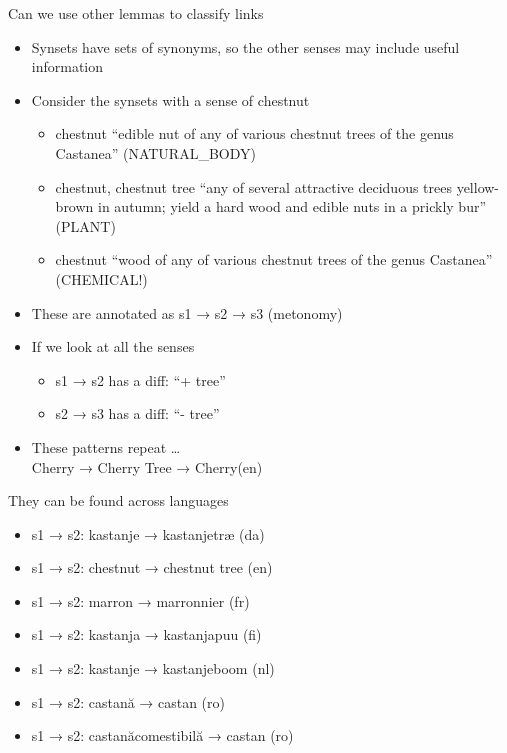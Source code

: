 \documentclass[dvipsnames]{beamer}
\begin{document}
\begin{frame}{Can we use other lemmas to classify links}

  \begin{itemize}
  \item Synsets have sets of synonyms, so the other senses may include useful information
  \item Consider the synsets with a sense of chestnut
    \begin{itemize}
    \item[s1] chestnut ``edible nut of any of various chestnut trees of the genus Castanea'' (NATURAL\_BODY)

    \item[s2] chestnut, chestnut tree ``any of several attractive deciduous trees yellow-brown in autumn; yield a hard wood and edible nuts in a prickly bur'' (PLANT)
    \item[s3] chestnut ``wood of any of various chestnut trees of the genus Castanea''
      (CHEMICAL!)
    \end{itemize}
  \item These are annotated as s1 → s2 → s3 (metonomy)
  \item If we look at all the senses
    \begin{itemize}
    \item  s1 → s2 has a diff: ``+ tree''
    \item s2 → s3 has a diff: ``- tree''
    \end{itemize}
  \item These patterns repeat \ldots
    \\ Cherry → Cherry Tree → Cherry\hfill (en)
  \end{itemize}

 
\end{frame}
\begin{frame}{They can be found across languages}

  \begin{itemize}
  \item s1 → s2: kastanje  →  kastanjetræ \hfill (da)
  \item s1 → s2: chestnut  →  chestnut tree \hfill (en)
  \item s1 → s2: marron →	marronnier \hfill (fr)
  \item s1 → s2: kastanja →	kastanjapuu \hfill (fi)
  \item  s1 → s2:	kastanje →	kastanjeboom \hfill (nl)
  \item  s1 → s2:	castană →	castan \hfill (ro)
  \item  s1 → s2:	castanăcomestibilă →	castan \hfill (ro)
    
  \end{itemize}	
\end{frame}
\end{document}
